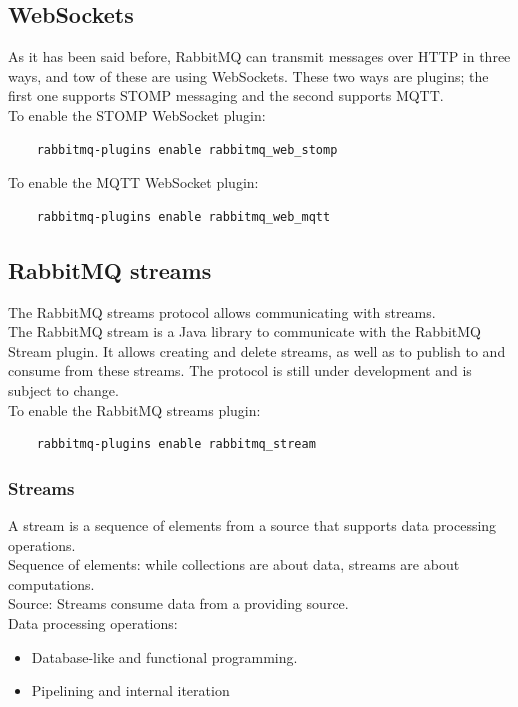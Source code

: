 \documentclass[12pt]{article}
\begin{document}
\subsection*{WebSockets}
As it has been said before, RabbitMQ can transmit messages over HTTP in three ways, and tow of these are using WebSockets. These two ways are plugins; the first one supports STOMP messaging and the second supports MQTT.\\
To enable the STOMP WebSocket plugin:
\begin{lstlisting}
    rabbitmq-plugins enable rabbitmq_web_stomp
\end{lstlisting}
To enable the MQTT WebSocket plugin:
\begin{lstlisting}
    rabbitmq-plugins enable rabbitmq_web_mqtt
\end{lstlisting}

\subsection*{RabbitMQ streams}
The RabbitMQ streams protocol allows communicating with streams.\\
The RabbitMQ stream is a Java library to communicate with the RabbitMQ Stream plugin. It allows creating and delete streams, as well as to publish to and consume from these streams. The protocol is still under development and is subject to change.\\
To enable the RabbitMQ streams plugin:
\begin{lstlisting}
    rabbitmq-plugins enable rabbitmq_stream
\end{lstlisting}

\subsubsection*{Streams}
A stream is a sequence of elements from a source that supports data processing operations.\\
Sequence of elements: while collections are about data, streams are about computations.\\
Source: Streams consume data from a providing source.\\
Data processing operations:

\begin{itemize}
    \item Database-like and functional programming.
    \item Pipelining and internal iteration
\end{itemize}
\end{document}
